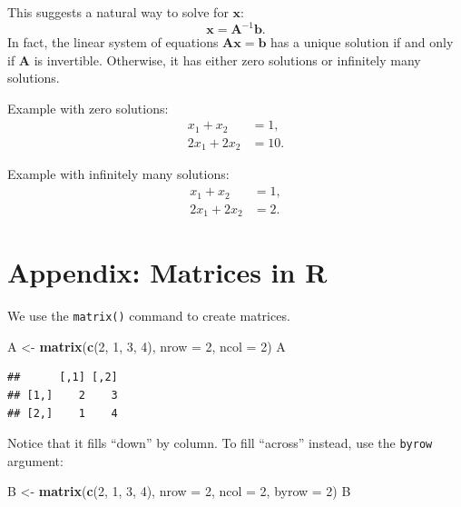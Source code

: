 \documentclass[
  12pt,
  oneside,openany]{book}
\newenvironment{Shaded}{\begin{snugshade}}{\end{snugshade}}
\newcommand{\DataTypeTok}[1]{\textcolor[rgb]{0.13,0.29,0.53}{#1}}
\newcommand{\DecValTok}[1]{\textcolor[rgb]{0.00,0.00,0.81}{#1}}
\newcommand{\KeywordTok}[1]{\textcolor[rgb]{0.13,0.29,0.53}{\textbf{#1}}}
\newcommand{\NormalTok}[1]{#1}
\newcommand{\StringTok}[1]{\textcolor[rgb]{0.31,0.60,0.02}{#1}}
\begin{document}
This suggests a natural way to solve for \(\mathbf{x}\): \[\mathbf{x} = \mathbf{A}^{-1} \mathbf{b}.\] In fact, the linear system of equations \(\mathbf{A} \mathbf{x} = \mathbf{b}\) has a unique solution if and only if \(\mathbf{A}\) is invertible. Otherwise, it has either zero solutions or infinitely many solutions.

Example with zero solutions:
\[
\begin{aligned}
x_1 + x_2 &= 1, \\
2 x_1 + 2 x_2 &= 10.
\end{aligned}
\]

Example with infinitely many solutions:
\[
\begin{aligned}
x_1 + x_2 &= 1, \\
2 x_1 + 2 x_2 &= 2.
\end{aligned}
\]

\hypertarget{appendix-matrices-in-r}{%
\section{Appendix: Matrices in R}\label{appendix-matrices-in-r}}

We use the \texttt{matrix()} command to create matrices.

\begin{Shaded}
\begin{Highlighting}[]
\NormalTok{A <{-}}\StringTok{ }\KeywordTok{matrix}\NormalTok{(}\KeywordTok{c}\NormalTok{(}\DecValTok{2}\NormalTok{, }\DecValTok{1}\NormalTok{, }\DecValTok{3}\NormalTok{, }\DecValTok{4}\NormalTok{),}
            \DataTypeTok{nrow =} \DecValTok{2}\NormalTok{,}
            \DataTypeTok{ncol =} \DecValTok{2}\NormalTok{)}
\NormalTok{A}
\end{Highlighting}
\end{Shaded}

\begin{verbatim}
##      [,1] [,2]
## [1,]    2    3
## [2,]    1    4
\end{verbatim}

Notice that it fills ``down'' by column. To fill ``across'' instead, use the \texttt{byrow} argument:

\begin{Shaded}
\begin{Highlighting}[]
\NormalTok{B <{-}}\StringTok{ }\KeywordTok{matrix}\NormalTok{(}\KeywordTok{c}\NormalTok{(}\DecValTok{2}\NormalTok{, }\DecValTok{1}\NormalTok{, }\DecValTok{3}\NormalTok{, }\DecValTok{4}\NormalTok{),}
            \DataTypeTok{nrow =} \DecValTok{2}\NormalTok{,}
            \DataTypeTok{ncol =} \DecValTok{2}\NormalTok{,}
            \DataTypeTok{byrow =} \DecValTok{2}\NormalTok{)}
\NormalTok{B}
\end{Highlighting}
\end{Shaded}
\end{document}
